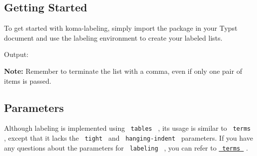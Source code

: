 \subsection{Getting Started}\label{getting-started}

To get started with koma-labeling, simply import the package in your
Typst document and use the labeling environment to create your labeled
lists.

\begin{Shaded}
\begin{Highlighting}[]

\NormalTok{  (}
\NormalTok{  )}
\NormalTok{)}


\NormalTok{  (}
\NormalTok{    ([\#lorem(1)], [\#lorem(10)]),}
\NormalTok{    ([\#lorem(2)], [\#lorem(20)]),}
\NormalTok{    ([\#lorem(3)], [\#lorem(30)]),}
\NormalTok{  )}
\NormalTok{)}
\end{Highlighting}
\end{Shaded}

Output:


\textbf{Note:} Remember to terminate the list with a comma, even if only
one pair of items is passed.

\begin{Shaded}
\begin{Highlighting}[]

\NormalTok{  (}
\NormalTok{  )}
\NormalTok{)}
\end{Highlighting}
\end{Shaded}

\subsection{Parameters}\label{parameters}

Although labeling is implemented using \texttt{\ tables\ } , its usage
is similar to \texttt{\ terms\ } , except that it lacks the
\texttt{\ tight\ } and \texttt{\ hanging-indent\ } parameters. If you
have any questions about the parameters for \texttt{\ labeling\ } , you
can refer to
\href{https://typst.app/docs/reference/model/terms/}{\texttt{\ terms\ }}
.

